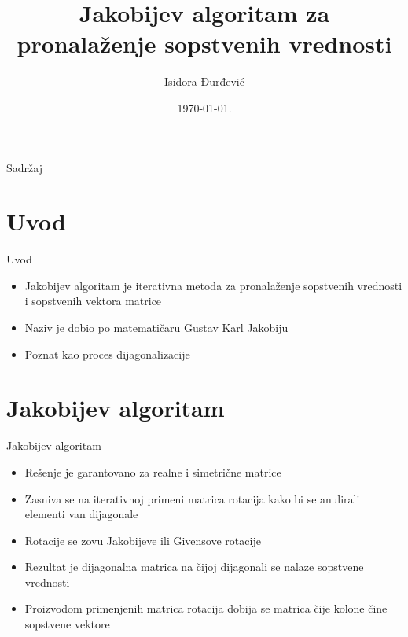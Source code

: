 \documentclass[serbian]{beamer}
\title[Jakobijev algoritam za pronalaženje sopstvenih vrednosti]{Jakobijev algoritam za pronalaženje sopstvenih vrednosti}
\author{Isidora Đurđević}
\institute{Matematički fakultet, \\ Univerzitet u Beogradu}
\date{\today.}
\begin{document}
\begin{frame}
  	\titlepage
\end{frame}

\begin{frame}{Sadr\v zaj}
  	\tableofcontents
\end{frame}

\section{Uvod}

\begin{frame}{Uvod}

\begin{itemize}
	\item Jakobijev algoritam je iterativna metoda za pronalaženje sopstvenih vrednosti i sopstvenih vektora matrice
	\item Naziv je dobio po matematičaru Gustav Karl Jakobiju
	\item Poznat kao proces dijagonalizacije
\end{itemize}

\end{frame}

\section{Jakobijev algoritam}

\begin{frame}{Jakobijev algoritam}

\begin{itemize}
	\item Rešenje je garantovano za realne i simetrične matrice
	\item Zasniva se na iterativnoj primeni matrica rotacija kako bi se anulirali elementi van dijagonale
	\item Rotacije se zovu Jakobijeve ili Givensove rotacije
	\item Rezultat je dijagonalna matrica na čijoj dijagonali se nalaze sopstvene vrednosti
	\item Proizvodom primenjenih matrica rotacija dobija se matrica čije kolone čine sopstvene vektore
\end{itemize}

\end{frame}
\end{document}
